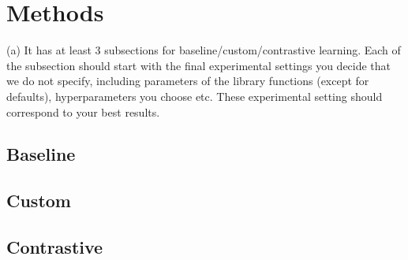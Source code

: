 \section*{Methods}

(a) It has at least 3 subsections for baseline/custom/contrastive learning. Each of the subsection should start with the final experimental settings you decide that we do not specify, including parameters of the library functions (except for defaults), hyperparameters you choose etc. These experimental setting should correspond to your best results.

\subsection*{Baseline}

\subsection*{Custom}

\subsection*{Contrastive}

